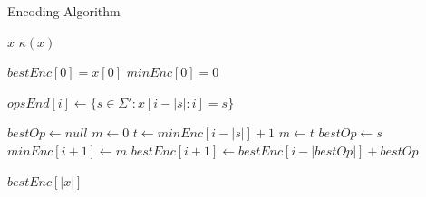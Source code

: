 \documentclass[letterpaper]{article}
\begin{document}
\algnewcommand{}
\algnewcommand{}

\algnewcommand\INPUT{\item[\algorithmicinput]}
\algnewcommand\OUTPUT{\item[\algorithmicoutput]}

\begin{algorithm}
\caption{Encoding Algorithm}
\label{Encoding Algorithm}
\begin{algorithmic}[1]
\INPUT $x$
\OUTPUT $\kappa(x)$



\State $bestEnc[0] = x[0]$
\State $minEnc[0] = 0$

	 \State $opsEnd[i] \gets \{s \in \Sigma' : x[i-|s|:i] = s\}$
\EndFor

	\State $bestOp \gets null$
	\State $m \gets 0$ 
		\State $t \gets minEnc[i-|s|] + 1$
			\State $m \gets t$ 
			\State $bestOp \gets s$
		\EndIf
	\EndFor
	\State $minEnc[i+1] \gets m$
	\State $bestEnc[i+1] \gets bestEnc[i-|bestOp|] + bestOp$
\EndFor

\State \Return $bestEnc[|x|]$

\EndProcedure
\end{algorithmic}
\end{algorithm}

%
%
%
%
%
%
%
\end{document}
